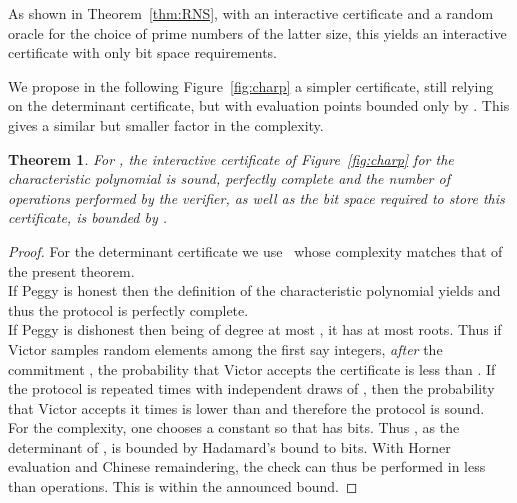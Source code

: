 \documentclass{article}
\newcommand{\customvspace}[1]{}
\let\oldresizebox\resizebox
\renewcommand{\resizebox}[3]{\oldresizebox{\linewidth}{!}{#3}}
\newtheorem{theorem}{Theorem}
\begin{document}
As shown in Theorem~\ref{thm:RNS}, with an interactive certificate and a random
oracle for the choice of prime numbers of the latter size, this yields an
interactive certificate with only  bit space requirements.
 
We propose in the following Figure~\ref{fig:charp} a simpler
certificate, still relying on the determinant certificate, but with
evaluation points bounded only by . This gives a similar but smaller
 factor in the complexity.

\begin{figure*}[htbp]\center 
  \noindent\resizebox{.8\linewidth}{!}{
  }
  \caption{Interactive certificate for the characteristic polynomial}\label{fig:charp}\customvspace{5pt}
\end{figure*}


\begin{theorem}\label{th:charp}
  For , 
  the interactive certificate of Figure~\ref{fig:charp} for
  the characteristic polynomial is sound, perfectly complete and the number of
  operations performed by the verifier, as well as the bit space
  required to store this certificate, is bounded by
  .
\end{theorem}
\begin{proof}
  For the determinant certificate we
  use~\cite[Theorem~5]{Kaltofen:2011:quadcert} whose complexity
  matches that of the present theorem.\\
   
  If Peggy is honest then the definition of the
  characteristic polynomial yields  and thus
  the protocol is perfectly complete.\\
   
  If Peggy is dishonest then  being of degree at most
  , it has at most  roots. Thus if Victor samples random
  elements among the first say  integers, {\em after} the
  commitment , the probability that
  Victor accepts the certificate is less than . If the protocol
  is repeated  times with independent draws of , then the
  probability that Victor accepts it  times is lower than
   and therefore the protocol is sound.\\

  For the complexity, one chooses a constant  so that 
  has  bits. Thus , as the determinant of 
  , is bounded by Hadamard's bound to
   bits.  
  With Horner evaluation and Chinese
  remaindering, the check 
   can thus be performed in less than
   operations.  
  This is within the announced bound. 
\end{proof}
\end{document}
